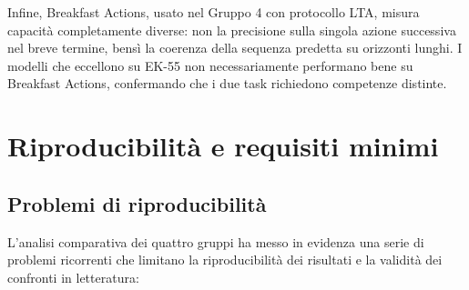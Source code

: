 Infine, Breakfast Actions, usato nel Gruppo 4 con protocollo LTA, misura capacità completamente diverse: non la precisione sulla singola azione successiva nel breve termine, bensì la coerenza della sequenza predetta su orizzonti lunghi. I modelli che eccellono su EK-55 non necessariamente performano bene su Breakfast Actions, confermando che i due task richiedono competenze distinte.

\section{Riproducibilità e requisiti minimi}
\label{riprod}
\subsection{Problemi di riproducibilità}
L'analisi comparativa dei quattro gruppi ha messo in evidenza una serie di problemi ricorrenti che limitano la riproducibilità dei risultati e la validità dei confronti in letteratura:
